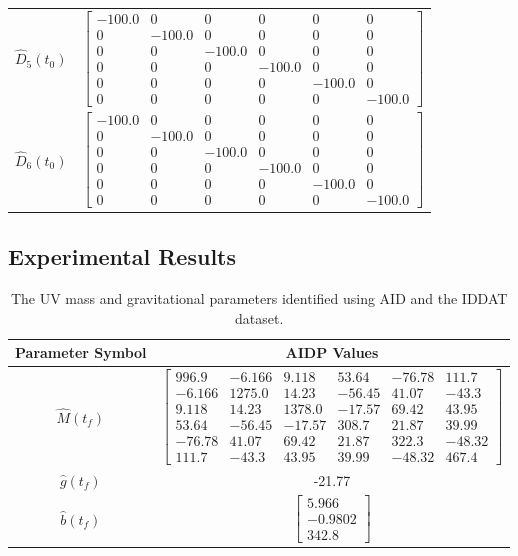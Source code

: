 \begin{table}[htbp]
\begin{center}
\begin{tabular}{c|c}
$\hat{D}_5(t_0)$ & $ \left[\begin{array}{cccccc} -100.0 & 0 & 0 & 0 & 0 & 0\\ 0 & -100.0 & 0 & 0 & 0 & 0\\ 0 & 0 & -100.0 & 0 & 0 & 0\\ 0 & 0 & 0 & -100.0 & 0 & 0\\ 0 & 0 & 0 & 0 & -100.0 & 0\\ 0 & 0 & 0 & 0 & 0 & -100.0 \end{array}\right] $ \\ 
$\hat{D}_6(t_0)$ & $ \left[\begin{array}{cccccc} -100.0 & 0 & 0 & 0 & 0 & 0\\ 0 & -100.0 & 0 & 0 & 0 & 0\\ 0 & 0 & -100.0 & 0 & 0 & 0\\ 0 & 0 & 0 & -100.0 & 0 & 0\\ 0 & 0 & 0 & 0 & -100.0 & 0\\ 0 & 0 & 0 & 0 & 0 & -100.0 \end{array}\right] $ \\ 
\end{tabular}
\end{center}
\label{chUV_AID.tb.UVSE3_INIT_dragParam}
\end{table}


\subsection{Experimental Results}%

\begin{table}[htbp]
\ssp
\caption{The \ac{UV} mass and gravitational parameters identified
  using \ac{AID} and the \ac{IDDAT} dataset.}
\begin{center}
\begin{tabular}{c|c}
Parameter Symbol & \ac{AIDP} Values \\ \hline
$\hat{M}(t_f)$ & $ \left[\begin{array}{cccccc} 996.9 & -6.166 & 9.118 & 53.64 & -76.78 & 111.7\\ -6.166 & 1275.0 & 14.23 & -56.45 & 41.07 & -43.3\\ 9.118 & 14.23 & 1378.0 & -17.57 & 69.42 & 43.95\\ 53.64 & -56.45 & -17.57 & 308.7 & 21.87 & 39.99\\ -76.78 & 41.07 & 69.42 & 21.87 & 322.3 & -48.32\\ 111.7 & -43.3 & 43.95 & 39.99 & -48.32 & 467.4 \end{array}\right] $ \\ 
$\hat{g}(t_f)$ & -21.77 \\ 
$\hat{b}(t_f)$ & $ \left[\begin{array}{c} 5.966\\ -0.9802\\ 342.8 \end{array}\right] $ \\ 
\end{tabular}
\end{center}
\label{chUV_AID.tb.UVSE3_AID_massGravParam}
\end{table}



